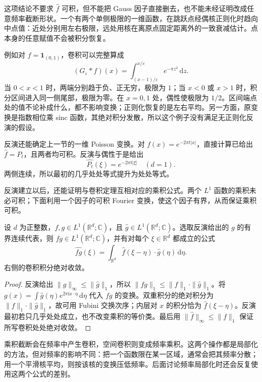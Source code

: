 这项结论不要求 \(\widehat f\) 可积，但不能把 Gauss 因子直接删去，也不能未经证明改成任意频率截断形状。一个有两个单侧极限的一维函数，在跳跃点经偶核正则化时趋向中点值：近处分别用左右极限，远处用核在离原点固定距离外的一致衰减估计。点本身的任意赋值不会被积分恢复。

\ProseParagraphBreak

例如对 \(f=\mathbf1_{(0,1)}\)，卷积可以完整算成
\[
 (G_\varepsilon*f)(x)
 =\int_{(x-1)/\varepsilon}^{x/\varepsilon}e^{-\pi z^2}\,\mathrm dz.
\]
当 \(0<x<1\) 时，两端分别趋于负、正无穷，极限为 \(1\)；当 \(x<0\) 或 \(x>1\) 时，积分区间进入同一侧尾部，极限为零。在 \(x=0,1\) 处，偶性使极限为 \(1/2\)。区间端点处的值不论补成什么，都不影响变换；正则化恢复的是左右平均。另一方面，原变换是指数相位乘 sinc 函数，其绝对积分发散，所以这个例子没有满足无正则化反演的假设。

\ProseParagraphBreak

反演还能确定上一节的一维 Poisson 变换。对 \(f(x)=e^{-2\pi t|x|}\)，直接计算已给出 \(\widehat f=P_t\)，且两者均可积。反演与偶性于是给出
\[
 \widehat {P_t}(\xi)=e^{-2\pi t|\xi|}\quad(d=1).
\]
两侧连续，所以最初的几乎处处等式提升为处处等式。

反演建立以后，还能证明与卷积定理互相对应的乘积公式。两个 \(L^1\) 函数的乘积未必可积；下面利用一个因子的可积 Fourier 变换，使这个因子有界，从而保证乘积可积。

\begin{proposition}\label{b2:prop:03-product-transform}
设 \(d\) 为正整数，\(f,g\in L^1(\mathbb R^d;\mathbb C)\)，且 \(\widehat g\in L^1(\mathbb R^d;\mathbb C)\)。选取反演给出的 \(g\) 的有界连续代表，则 \(fg\in L^1(\mathbb R^d;\mathbb C)\)，并有对每个 \(\xi\in\mathbb R^d\) 都成立的公式
\[
 \widehat{fg}(\xi)=\int_{\mathbb R^d}\widehat f(\xi-\eta)\cdot\widehat g(\eta)\,\mathrm d\eta.
\]
右侧的卷积积分绝对收敛。
\end{proposition}
\begin{proof}
反演给出 \(\|g\|_\infty\leq\|\widehat g\|_1\)，所以 \(\|fg\|_1\leq\|f\|_1\cdot\|\widehat g\|_1\)。将 \(g(x)=\int\widehat g(\eta)e^{2\pi\mathrm i x\cdot\eta}\,\mathrm d\eta\) 代入 \(fg\) 的变换。双重积分的绝对积分为 \(\|f\|_1\cdot\|\widehat g\|_1\)，故可用 Fubini 交换次序；内层对 \(x\) 的积分恰为 \(\widehat f(\xi-\eta)\)。反演最初若只几乎处处成立，也不改变乘积的等价类。最后用 \(\|\widehat f\|_\infty\leq\|f\|_1\) 保证所写卷积处处绝对收敛。
\end{proof}

乘积截断会在频率中产生卷积，空间卷积则变成频率乘积。这两个操作都是局部化的方法，但对频率的影响不同：把一个函数限在某一区域，通常会把其频率分散；用一个平滑核平均，则按该核的变换压低频率。后面讨论频率局部化时还会反复使用这两个公式的差别。

